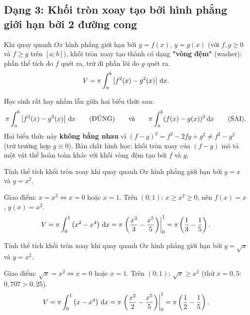 \newpage
\subsection{Dạng 3: Khối tròn xoay tạo bởi hình phẳng giới hạn bởi 2 đường cong}

\begin{hopphuongphap}
Khi quay quanh $Ox$ hình phẳng giới hạn bởi $y=f(x)$, $y=g(x)$ (với $f,g\ge0$ và $f\ge g$ trên $[a;b]$), khối tròn xoay tạo thành có dạng \textbf{"vòng đệm"} (washer): phần thể tích do $f$ quét ra, trừ đi phần lõi do $g$ quét ra.
\[
V=\pi\int_a^b \left| f^2(x)-g^2(x) \right|\,\mathrm{d}x.
\]
\end{hopphuongphap}

\begin{hopchuy}
Học sinh rất hay nhầm lẫn giữa hai biểu thức sau:
\[
\pi\int_a^b\left| f^2(x)-g^2(x) \right|\,\mathrm{d}x \qquad \text{(ĐÚNG)} \qquad\text{và}\qquad \pi\int_a^b (f(x)-g(x))^2\,\mathrm{d}x \qquad \text{(SAI)}.
\]
Hai biểu thức này \textbf{không bằng nhau} vì $(f-g)^2 = f^2-2fg+g^2 \ne f^2-g^2$ (trừ trường hợp $g\equiv0$). Bản chất hình học: khối tròn xoay của $(f-g)$ mô tả một vật thể hoàn toàn khác với khối vòng đệm tạo bởi $f$ và $g$.
\end{hopchuy}

\begin{hopvidu}
Tính thể tích khối tròn xoay khi quay quanh $Ox$ hình phẳng giới hạn bởi $y=x$ và $y=x^2$.
\end{hopvidu}
\begin{loigiai}
Giao điểm: $x=x^2 \Leftrightarrow x=0$ hoặc $x=1$. Trên $(0;1)$: $x\ge x^2\ge0$, nên $f(x)=x$, $g(x)=x^2$.
\[
V=\pi\int_0^1\left(x^2-x^4\right)\,\mathrm{d}x = \pi\left.\left(\frac{x^3}{3}-\frac{x^5}{5}\right)\right|_0^1 = \pi\left(\frac13-\frac15\right).
\]
\end{loigiai}

\begin{hopvidu}
Tính thể tích khối tròn xoay khi quay quanh $Ox$ hình phẳng giới hạn bởi $y=\sqrt{x}$ và $y=x^2$.
\end{hopvidu}
\begin{loigiai}
Giao điểm: $\sqrt{x}=x^2 \Leftrightarrow x=0$ hoặc $x=1$. Trên $(0;1)$: $\sqrt{x}\ge x^2$ (thử $x=0{,}5$: $0{,}707>0{,}25$).
\[
V=\pi\int_0^1\left(x-x^4\right)\,\mathrm{d}x = \pi\left.\left(\frac{x^2}{2}-\frac{x^5}{5}\right)\right|_0^1 = \pi\left(\frac12-\frac15\right).
\]
\end{loigiai}

